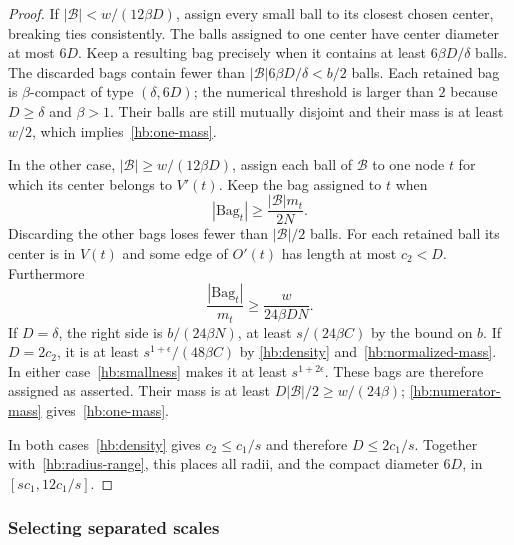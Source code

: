 \begin{proof}
If $|\mathcal B|<w/(12\beta D)$, assign every small ball to its closest
chosen center, breaking ties consistently.  The balls assigned to one
center have center diameter at most $6D$.  Keep a resulting bag
precisely when it contains at least $6\beta D/\delta$ balls.
The discarded bags contain fewer than
$|\mathcal B|6\beta D/\delta<b/2$ balls.  Each retained bag is
$\beta$-compact of type $(\delta,6D)$; the numerical threshold is
larger than $2$ because $D\ge\delta$ and $\beta>1$.
Their balls are still mutually disjoint and their mass is at least
$w/2$, which implies~\eqref{hb:one-mass}.

In the other case, $|\mathcal B|\ge w/(12\beta D)$, assign each ball
of $\mathcal B$ to one node $t$ for which its center belongs to $V'(t)$.
Keep the bag assigned to $t$ when
\[
 |\mathrm{Bag}_t|\ge\frac{|\mathcal B|m_t}{2N}.
\]
Discarding the other bags loses fewer than $|\mathcal B|/2$ balls.
For each retained ball its center is in $V(t)$ and some edge of
$O'(t)$ has length at most $c_2<D$.  Furthermore
\begin{equation}\label{hb:assignment-size}
 \frac{|\mathrm{Bag}_t|}{m_t}
 \ge\frac{w}{24\beta DN}.
\end{equation}
If $D=\delta$, the right side is $b/(24\beta N)$, at least
$s/(24\beta C)$ by the bound on $b$.  If $D=2c_2$, it is at least
$s^{1+\epsilon}/(48\beta C)$ by
\eqref{hb:density} and~\eqref{hb:normalized-mass}.
In either case~\eqref{hb:smallness} makes it at least
$s^{1+2\epsilon}$.  These bags are therefore assigned as asserted.
Their mass is at least $D|\mathcal B|/2\ge w/(24\beta)$;
\eqref{hb:numerator-mass} gives~\eqref{hb:one-mass}.

In both cases~\eqref{hb:density} gives $c_2\le c_1/s$ and therefore
$D\le2c_1/s$.  Together with~\eqref{hb:radius-range}, this places all
radii, and the compact diameter $6D$, in $[sc_1,12c_1/s]$.
\end{proof}

\subsubsection{Selecting separated scales}

